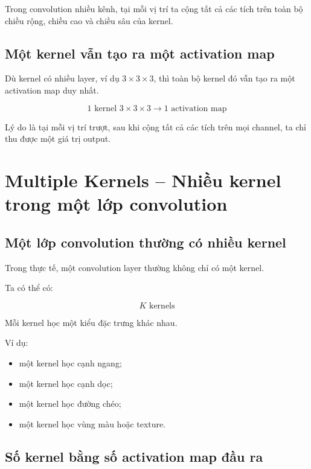 \begin{ghinho}
Trong convolution nhiều kênh, tại mỗi vị trí ta cộng tất cả các tích trên toàn bộ chiều rộng, chiều cao và chiều sâu của kernel.
\end{ghinho}

\subsection{Một kernel vẫn tạo ra một activation map}

Dù kernel có nhiều layer, ví dụ $3\times3\times3$, thì toàn bộ kernel đó vẫn tạo ra một activation map duy nhất.

\[
    \text{1 kernel } 3\times3\times3
    \rightarrow
    \text{1 activation map}
\]

Lý do là tại mỗi vị trí trượt, sau khi cộng tất cả các tích trên mọi channel, ta chỉ thu được một giá trị output.

\section{Multiple Kernels -- Nhiều kernel trong một lớp convolution}

\subsection{Một lớp convolution thường có nhiều kernel}

Trong thực tế, một convolution layer thường không chỉ có một kernel.

Ta có thể có:

\[
    K \text{ kernels}
\]

Mỗi kernel học một kiểu đặc trưng khác nhau.

Ví dụ:

\begin{itemize}
    \item một kernel học cạnh ngang;
    \item một kernel học cạnh dọc;
    \item một kernel học đường chéo;
    \item một kernel học vùng màu hoặc texture.
\end{itemize}

\subsection{Số kernel bằng số activation map đầu ra}

